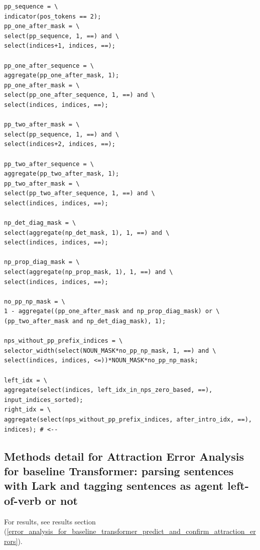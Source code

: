 \documentclass[11pt]{article}
\begin{document}
\begin{tiny}
\begin{verbatim}
pp_sequence = \
indicator(pos_tokens == 2);
pp_one_after_mask = \
select(pp_sequence, 1, ==) and \
select(indices+1, indices, ==);

pp_one_after_sequence = \
aggregate(pp_one_after_mask, 1);
pp_one_after_mask = \
select(pp_one_after_sequence, 1, ==) and \
select(indices, indices, ==);

pp_two_after_mask = \
select(pp_sequence, 1, ==) and \
select(indices+2, indices, ==);

pp_two_after_sequence = \
aggregate(pp_two_after_mask, 1);
pp_two_after_mask = \
select(pp_two_after_sequence, 1, ==) and \
select(indices, indices, ==);

np_det_diag_mask = \
select(aggregate(np_det_mask, 1), 1, ==) and \
select(indices, indices, ==);

np_prop_diag_mask = \
select(aggregate(np_prop_mask, 1), 1, ==) and \
select(indices, indices, ==);

no_pp_np_mask = \
1 - aggregate((pp_one_after_mask and np_prop_diag_mask) or \
(pp_two_after_mask and np_det_diag_mask), 1);

nps_without_pp_prefix_indices = \
selector_width(select(NOUN_MASK*no_pp_np_mask, 1, ==) and \
select(indices, indices, <=))*NOUN_MASK*no_pp_np_mask;

left_idx = \
aggregate(select(indices, left_idx_in_nps_zero_based, ==), input_indices_sorted);
right_idx = \
aggregate(select(nps_without_pp_prefix_indices, after_intro_idx, ==), indices); # <--
\end{verbatim}
\end{tiny}

\clearpage
\subsection{Methods detail for Attraction Error Analysis for \cite{Wu2023} baseline Transformer: parsing sentences with Lark and tagging sentences as agent left-of-verb or not  }
\label{appendix_error_analysis_for_baseline_transformer_methods}

For results, see results section (\ref{error_analysis_for_baseline_transformer_predict_and_confirm_attraction_errors}).
\end{document}

